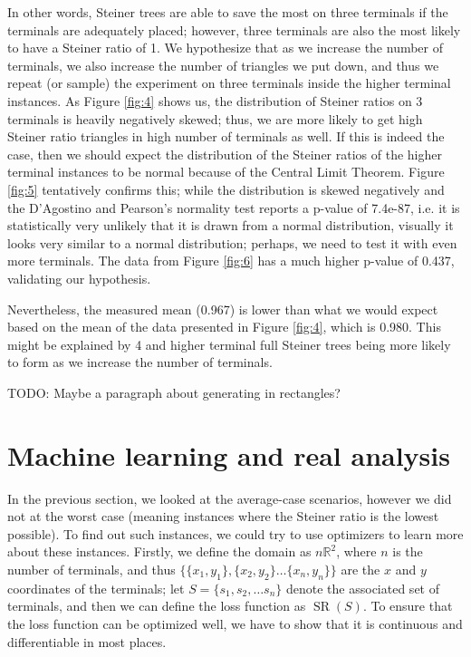 \documentclass{mpaper}
\begin{document}
In other words, Steiner trees are able to save the most on three terminals if the terminals are adequately placed; however, three terminals are also the most likely to have a Steiner ratio of 1. We hypothesize that as we increase the number of terminals, we also increase the number of triangles we put down, and thus we repeat (or sample) the experiment on three terminals inside the higher terminal instances. As Figure \ref{fig:4} shows us, the distribution of Steiner ratios on 3 terminals is heavily negatively skewed; thus, we are more likely to get high Steiner ratio triangles in high number of terminals as well. If this is indeed the case, then we should expect the distribution of the Steiner ratios of the higher terminal instances to be normal because of the Central Limit Theorem. Figure \ref{fig:5} tentatively confirms this; while the distribution is skewed negatively and the D'Agostino and Pearson's normality test reports a p-value of 7.4e-87, i.e. it is statistically very unlikely that it is drawn from a normal distribution, visually it looks very similar to a normal distribution; perhaps, we need to test it with even more terminals. The data from Figure \ref{fig:6} has a much higher p-value of 0.437, validating our hypothesis.

Nevertheless, the measured mean (0.967) is lower than what we would expect based on the mean of the data presented in Figure \ref{fig:4}, which is 0.980. This might be explained by 4 and higher terminal full Steiner trees being more likely to form as we increase the number of terminals. 

TODO: Maybe a paragraph about generating in rectangles?

\section{Machine learning and real analysis}\label{sec:mla}


In the previous section, we looked at the average-case scenarios, however we did not at the worst case (meaning instances where the Steiner ratio is the lowest possible). To find out such instances, we could try to use optimizers to learn more about these instances. Firstly, we define the domain as $n\mathbb{R}^{2}$, where $n$ is the number of terminals, and thus $\{\{x_1, y_1\}, \{x_2, y_2\} \dots \{x_n, y_n\}\}$ are the $x$ and $y$ coordinates of the terminals; let $S=\{s_1, s_2, \dots s_n\}$ denote the associated set of terminals, and then we can define the loss function as $\operatorname{SR}(S)$. To ensure that the loss function can be optimized well, we have to show that it is continuous and differentiable in most places.
\end{document}
